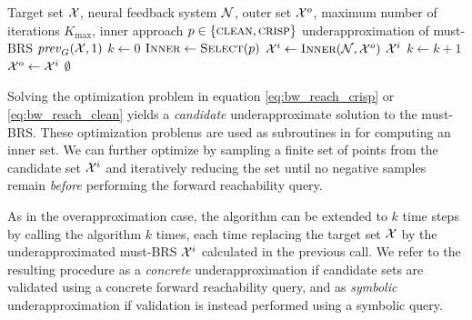 \documentclass[letterpaper, 10 pt, conference]{ieeeconf}  %
\begin{document}
\begin{algorithm}
\caption{Fast Inner Template Sets (FITS)}
\label{alg:fits}
\begin{algorithmic}[1]
\Require Target set $\mathcal{X}$, neural feedback system $\mathcal{N}$, outer set $\mathcal{X}^o$, maximum number of iterations $K_{\max}$, inner approach $p \in \{\textsc{clean},\textsc{crisp}\}$
\Ensure underapproximation of must-BRS $\mathit{prev}_G(\mathcal{X},1)$
\State $k \gets 0$ 
\Repeat
    \State $\textsc{Inner} \gets \textsc{Select}(p)$ 
    \State $\mathcal{X}^i \gets \textsc{Inner}(\mathcal{N},\mathcal{X}^o)$ 
        \State \Return $\mathcal{X}^i$ 
    \EndIf
    \State $k \gets k + 1$ 
    \State $\mathcal{X}^o \gets \mathcal{X}^i$ 
\State \Return $\emptyset$
\end{algorithmic}
\end{algorithm}
Solving the optimization problem in equation \eqref{eq:bw_reach_crisp} or \eqref{eq:bw_reach_clean} yields a \emph{candidate} underapproximate solution to the must-BRS. These optimization problems are used as subroutines in  for computing an inner set.
We can further optimize  by sampling a finite set of points from the candidate set $\mathcal{X}^{i}$ and iteratively reducing the set until no negative samples remain \emph{before} performing the forward reachability query.

As in the overapproximation case, the algorithm can be extended to $k$ time steps by
calling the algorithm $k$ times, each time replacing the target set $\mathcal{X}$ by the underapproximated must-BRS $\mathcal{X}^i$ calculated in the previous call.
We refer to the resulting procedure as a \emph{concrete} underapproximation if candidate sets are validated using a concrete forward reachability query, and as \emph{symbolic} underapproximation if validation is instead performed using a symbolic query.
\end{document}
